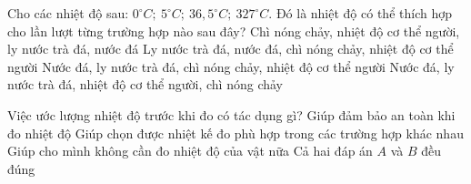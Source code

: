 \begin{ex}
	Cho các nhiệt độ sau: $0^\circ C;\ 5^\circ C;\ 36,5^\circ C;\ 327^\circ C$. Đó là nhiệt độ có thể thích hợp cho lần lượt từng trường hợp nào sau đây?
	\choice
	{Chì nóng chảy, nhiệt độ cơ thể người, ly nước trà đá, nước đá}
	{Ly nước trà đá, nước đá, chì nóng chảy, nhiệt độ cơ thể người}
	{Nước đá, ly nước trà đá, chì nóng chảy, nhiệt độ cơ thể người}
	{\True Nước đá, ly nước trà đá, nhiệt độ cơ thể người, chì nóng chảy}
	\end{ex}


\begin{ex} 
	Việc ước lượng nhiệt độ trước khi đo có tác dụng gì?
	\choice
	{Giúp đảm bảo an toàn khi đo nhiệt độ}
	{Giúp chọn được nhiệt kế đo phù hợp trong các trường hợp khác nhau}
	{Giúp cho mình không cần đo nhiệt độ của vật nữa}
	{\True Cả hai đáp án $A$ và $B$ đều đúng}
	
\end{ex}



